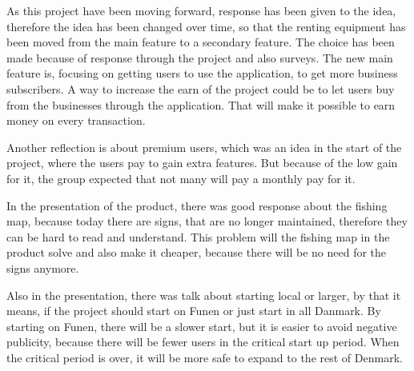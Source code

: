 As this project have been moving forward, response has been given to the idea, therefore the idea has been changed over time, so that the renting equipment has been moved from the main feature to a secondary feature. The choice has been made because of response through the project and also surveys. The new main feature is, focusing on getting users to use the application, to get more business subscribers. A way to increase the earn of the project could be to let users buy from the businesses through the application. That will make it possible to earn money on every transaction. 


Another reflection is about premium users, which was an idea in the start of the project, where the users pay to gain extra features. But because of the low gain for it, the group expected that not many will pay a monthly pay for it. 


In the presentation of the product, there was good response about the fishing map, because today there are signs, that are no longer  maintained, therefore they can be hard to read and understand. This problem will the fishing map in the product solve and also make it cheaper, because there will be no need for the signs anymore.


Also in the presentation, there was talk about starting local or larger, by that it means, if the project should start on Funen or just start in all Danmark. By starting on Funen, there will be a slower start, but it is easier to avoid negative publicity, because there will be fewer users in the critical start up period. When the critical period is over, it will be more safe to expand to the rest of Denmark.